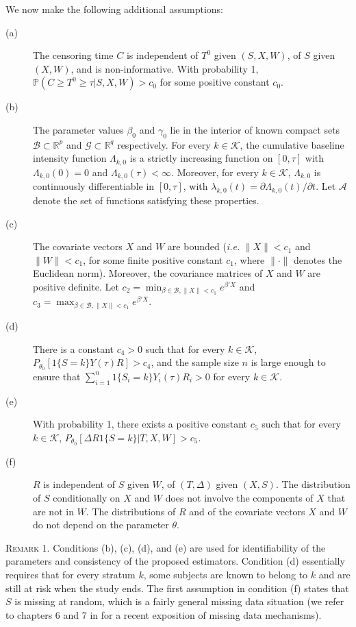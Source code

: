 \documentclass{statsoc}
\begin{document}
We now make the following additional assumptions:
\begin{description}
\item[(a)] The censoring time $C$ is independent of $T^0$ given $(S, X, W)$, of $S$ given $(X, W)$, and is non-informative. With probability 1, $\mathbb P(C\geq T^0\geq \tau|S, X, W)>c_0$ for some positive constant $c_0$.
\item[(b)] The parameter values $\beta_0$ and $\gamma_0$ lie in the interior of known compact sets $\mathcal B\subset {\ensuremath{\mathbb{R}}}^p$ and $\mathcal G\subset {\ensuremath{\mathbb{R}}}^q$ respectively. For every $k\in\mathcal K$, the cumulative baseline intensity function $\Lambda_{k,0}$ is a strictly increasing function on $[0,\tau]$ with $\Lambda_{k,0}(0)=0$ and $\Lambda_{k,0}(\tau)<\infty$. Moreover, for every $k\in\mathcal K$, $\Lambda_{k,0}$ is continuously differentiable in $[0,\tau]$, with $\lambda_{k,0}(t)=\partial\Lambda_{k,0}(t)\slash\partial t$. Let $\mathcal A$ denote the set of functions satisfying these properties.
\item[(c)] The covariate vectors $X$ and $W$ are bounded (\textit{i.e.} $\|X\|<c_1$ and $\|W\|<c_1$, for some finite positive constant $c_1$, where $\|\cdot\|$ denotes the Euclidean norm). Moreover, the covariance matrices of $X$ and $W$ are positive definite. Let $c_2=\min_{\beta\in\mathcal B, \|X\|<c_1}e^{\beta'X}$ and $c_3=\max_{\beta\in\mathcal B, \|X\|<c_1}e^{\beta'X}$.
\item[(d)] There is a constant $c_4>0$ such that for every $k\in\mathcal K$, $P_{\theta_0}[1\{S=k\}Y(\tau)R]>c_4$, and the sample size $n$ is large enough to ensure that $\sum_{i=1}^n 1\{S_i=k\}Y_i(\tau)R_i>0$ for every $k\in\mathcal K$.
\item[(e)] With probability 1, there exists a positive constant $c_5$ such that for every $k\in\mathcal K$, $P_{\theta_0}[\Delta R 1\{S=k\}|T, X, W]>c_5$.
\item[(f)] $R$ is independent of $S$ given $W$, of $(T, \Delta)$ given $(X,S)$. The distribution of $S$ conditionally on $X$ and $W$ does not involve the components of $X$ that are not in $W$. The distributions of $R$ and of the covariate vectors $X$ and $W$ do not depend on the parameter $\theta$.
\end{description}
\textsc{Remark 1.} Conditions (b), (c), (d), and (e) are used for identifiability of the parameters and consistency of the proposed estimators. Condition (d) essentially requires that for every stratum $k$, some subjects are known to belong to $k$ and are still at risk when the study ends. The first assumption in condition (f) states that $S$ is missing at random, which is a fairly general missing data situation (we refer to chapters 6 and 7 in \cite{tsi06} for a recent exposition of missing data mechanisms).
\end{document}
